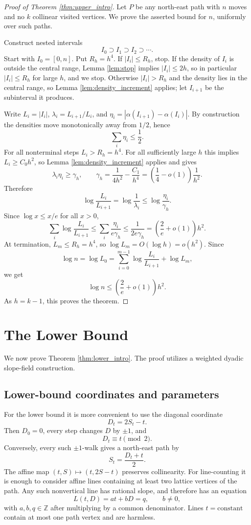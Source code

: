 \documentclass[11pt]{article}
\theoremstyle{definition}
\theoremstyle{remark}
\newcommand{\Z}{\mathbb Z}
\newcommand{\1}{\mathbf 1}
\begin{document}
\begin{proof}[Proof of Theorem \ref{thm:upper_intro}]
Let $P$ be any north-east path with $n$ moves and no $k$ collinear visited vertices. We prove the asserted bound for $n$, uniformly over such paths.

\bigskip
\noindent
Construct nested intervals
\[
I_0\supset I_1\supset I_2\supset\cdots.
\]
Start with $I_0=[0,n]$. Put $R_h=h^4$. If $|I_i|\le R_h$, stop. If the density of $I_i$ is outside the central range, Lemma \ref{lem:stop} implies $|I_i|\le2h$, so in particular $|I_i|\le R_h$ for large $h$, and we stop. Otherwise $|I_i|>R_h$ and the density lies in the central range, so Lemma \ref{lem:density_increment} applies; let $I_{i+1}$ be the subinterval it produces.

\bigskip
\noindent
Write $L_i=|I_i|$, $\lambda_i=L_{i+1}/L_i$, and $\eta_i=|\alpha(I_{i+1})-\alpha(I_i)|$. By construction the densities move monotonically away from $1/2$, hence
\[
\sum_i\eta_i\le \frac12.
\]
For all nonterminal steps $L_i>R_h=h^4$.  For all sufficiently large $h$ this implies $L_i\ge C_0h^2$, so Lemma \ref{lem:density_increment} applies and gives
\[
\lambda_i\eta_i\ge \gamma_h,
\qquad
\gamma_h=\frac1{4h^2}-\frac{C_1}{h^4}
=\left(\frac14-o(1)\right)\frac1{h^2}.
\]
Therefore
\[
\log\frac{L_i}{L_{i+1}}=\log\frac1{\lambda_i}\le \log\frac{\eta_i}{\gamma_h}.
\]
Since $\log x\le x/e$ for all $x>0$,
\[
\sum_i\log\frac{L_i}{L_{i+1}}
\le \sum_i\frac{\eta_i}{e\gamma_h}
\le \frac{1}{2e\gamma_h}
=\left(\frac{2}{e}+o(1)\right)h^2.
\]
At termination, $L_m\le R_h=h^4$, so $\log L_m=O(\log h)=o(h^2)$. Since
\[
\log n=\log L_0=\sum_{i=0}^{m-1}\log\frac{L_i}{L_{i+1}}+\log L_m,
\]
we get
\[
\log n\le \left(\frac{2}{e}+o(1)\right)h^2.
\]
As $h=k-1$, this proves the theorem.
\end{proof}

\section{The Lower Bound}\label{sec:dyadic_lower}

We now prove Theorem \ref{thm:lower_intro}.  The proof utilizes a weighted dyadic slope-field construction.

\subsection{Lower-bound coordinates and parameters}

For the lower bound it is more convenient to use the diagonal coordinate
\[
D_t=2S_t-t.
\]
Then $D_0=0$, every step changes $D$ by $\pm1$, and
\[
D_t\equiv t\pmod 2.
\]
Conversely, every such $\pm1$-walk gives a north-east path by
\[
S_t=\frac{D_t+t}{2}.
\]
The affine map $(t,S)\mapsto(t,2S-t)$ preserves collinearity.  For line-counting it is enough to consider affine lines containing at least two
lattice vertices of the path.  Any such nonvertical line has rational slope, and therefore has an equation
\[
L(t,D)=at+bD=q,
\qquad b\ne0,
\]
with $a,b,q\in\Z$ after multiplying by a common denominator.  Lines $t=\text{constant}$ contain at most one path vertex and are harmless.
\end{document}
